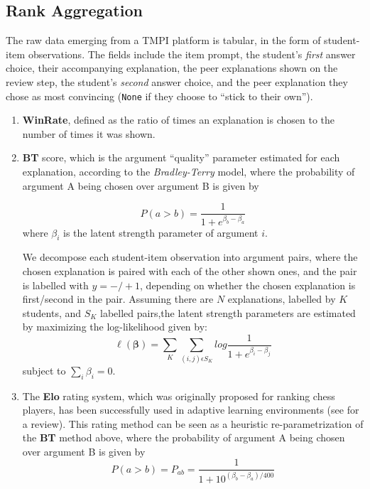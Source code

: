 \documentclass[sigconf]{acmart}
\begin{document}
\subsection{Rank Aggregation}
The raw data emerging from a TMPI platform is tabular, in the form of 
student-item observations.
The fields include the item prompt, the student's \textit{first} answer choice, 
their accompanying explanation, the peer explanations shown on the review step, 
the student's \textit{second} answer choice, and the peer explanation they 
chose as most convincing (\verb|None| if they choose to ``stick to their own'').

\begin{enumerate}

	\item \textbf{WinRate}, defined as the ratio of times an explanation is 
	chosen to the number of times it was shown.

	\item \textbf{BT} score, which is the argument ``quality'' parameter 
	estimated for each explanation, according to the \textit{Bradley-Terry} 
	model, where the probability of argument A being chosen over argument B is 
	given by 

	$$
	P(a>b) = 
	\frac{1}{1+e^{\beta_b-\beta_a}}
	$$
	where $\beta_i$ is the latent strength parameter of argument $i$. 
	
	We decompose each student-item observation into argument pairs, where the 
	chosen explanation is paired with each of the other shown ones, and the 
	pair is labelled with $y=-/+1$, depending on whether the chosen explanation 
	is first/second in the pair.
	Assuming there are $N$ explanations, labelled by $K$ students, and $S_K$ 
	labelled pairs,the latent strength parameters are estimated by maximizing 
	the log-likelihood given by:
	$$
	\ell(\boldsymbol{\beta})=\sum_{K}\sum_{(i,j)\epsilon S_K}^{} 
	log\frac{1}{1+e^{\beta_i - \beta_j}}
	$$
	subject to $\sum_{i}\beta_i=0$.


	\item The \textbf{Elo} rating system\cite{elo_rating_1978}, which was 
	originally proposed for ranking chess players, has been successfully used 
	in adaptive learning environments (see \cite{pelanek_applications_2016} for 
	a review). 
	This rating method can be seen as a heuristic re-parametrization of the 
	\textbf{BT} method above, where the probability of argument A being chosen 
	over argument B is given by
	$$
	P(a>b) = P_{ab} = \frac{1}{1+10^{(\beta_b-\beta_a)/400}}
	$$


\end{enumerate}
\end{document}
